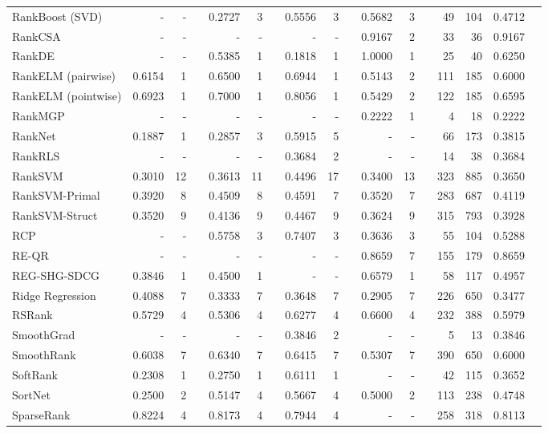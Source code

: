 \documentclass{sig-alternate}
\begin{document}
{\begin{longtable}[!hpt]{@{}lrrrrrrrrrrrrrrrr@{}}
RankBoost (SVD) & - & - && 0.2727 & 3 && 0.5556 & 3 && 0.5682 & 3 && 49 & 104 & 0.4712 \\
RankCSA & - & - && - & - && - & - && 0.9167 & 2 && 33 & 36 & 0.9167 \\
RankDE & - & - && 0.5385 & 1 && 0.1818 & 1 && 1.0000 & 1 && 25 & 40 & 0.6250 \\
RankELM (pairwise) & 0.6154 & 1 && 0.6500 & 1 && 0.6944 & 1 && 0.5143 & 2 && 111 & 185 & 0.6000 \\
RankELM (pointwise) & 0.6923 & 1 && 0.7000 & 1 && 0.8056 & 1 && 0.5429 & 2 && 122 & 185 & 0.6595 \\
RankMGP & - & - && - & - && - & - && 0.2222 & 1 && 4 & 18 & 0.2222 \\
RankNet & 0.1887 & 1 && 0.2857 & 3 && 0.5915 & 5 && - & - && 66 & 173 & 0.3815 \\
RankRLS & - & - && - & - && 0.3684 & 2 && - & - && 14 & 38 & 0.3684 \\
RankSVM & 0.3010 & 12 && 0.3613 & 11 && 0.4496 & 17 && 0.3400 & 13 && 323 & 885 & 0.3650 \\
RankSVM-Primal & 0.3920 & 8 && 0.4509 & 8 && 0.4591 & 7 && 0.3520 & 7 && 283 & 687 & 0.4119 \\
RankSVM-Struct & 0.3520 & 9 && 0.4136 & 9 && 0.4467 & 9 && 0.3624 & 9 && 315 & 793 & 0.3928 \\
RCP & - & - && 0.5758 & 3 && 0.7407 & 3 && 0.3636 & 3 && 55 & 104 & 0.5288 \\
RE-QR & - & - && - & - && - & - && 0.8659 & 7 && 155 & 179 & 0.8659 \\
REG-SHG-SDCG & 0.3846 & 1 && 0.4500 & 1 && - & - && 0.6579 & 1 && 58 & 117 & 0.4957 \\
Ridge Regression & 0.4088 & 7 && 0.3333 & 7 && 0.3648 & 7 && 0.2905 & 7 && 226 & 650 & 0.3477 \\
RSRank & 0.5729 & 4 && 0.5306 & 4 && 0.6277 & 4 && 0.6600 & 4 && 232 & 388 & 0.5979 \\
SmoothGrad & - & - && - & - && 0.3846 & 2 && - & - && 5 & 13 & 0.3846 \\
SmoothRank & 0.6038 & 7 && 0.6340 & 7 && 0.6415 & 7 && 0.5307 & 7 && 390 & 650 & 0.6000 \\
SoftRank & 0.2308 & 1 && 0.2750 & 1 && 0.6111 & 1 && - & - && 42 & 115 & 0.3652 \\
SortNet & 0.2500 & 2 && 0.5147 & 4 && 0.5667 & 4 && 0.5000 & 2 && 113 & 238 & 0.4748 \\
SparseRank & 0.8224 & 4 && 0.8173 & 4 && 0.7944 & 4 && - & - && 258 & 318 & 0.8113 \\

\end{longtable}}
\end{document}
